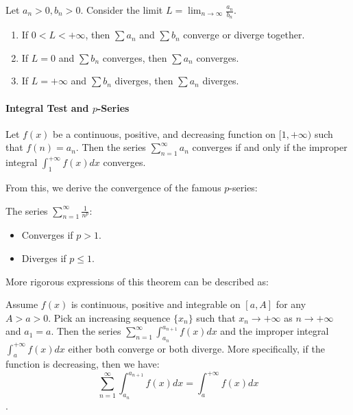 \begin{theorem}
Let $a_n > 0, b_n > 0$. Consider the limit $L = \lim_{n \to \infty} \frac{a_n}{b_n}$.
\begin{enumerate}
    \item If $0 < L < +\infty$, then $\sum a_n$ and $\sum b_n$ converge or diverge together.
    \item If $L = 0$ and $\sum b_n$ converges, then $\sum a_n$ converges.
    \item If $L = +\infty$ and $\sum b_n$ diverges, then $\sum a_n$ diverges.
\end{enumerate}
\end{theorem}

\paragraph{Integral Test and $p$-Series}
\begin{theorem}
Let $f(x)$ be a continuous, positive, and decreasing function on $[1, +\infty)$ such that $f(n) = a_n$. Then the series $\sum_{n=1}^{\infty} a_n$ converges if and only if the improper integral $\int_1^{+\infty} f(x) dx$ converges.
\end{theorem}

From this, we derive the convergence of the famous $p$-series:
\begin{corollary}[$p$-Series]
The series $\sum_{n=1}^{\infty} \frac{1}{n^p}$:
\begin{itemize}
    \item Converges if $p > 1$.
    \item Diverges if $p \le 1$.
\end{itemize}
\end{corollary}

More rigorous expressions of this theorem can be described as:

\begin{theorem}
    Assume $f(x)$ is continuous, positive and integrable on $[a,A]$ for any $A>a>0$. Pick an increasing sequence $\{x_n\}$ such that $x_n \to +\infty$ as $n \to +\infty$ and $a_1 = a$. Then the series $\sum_{n=1}^{\infty} \int_{a_n}^{a_{n+1}} f(x) dx$ and the improper integral $\int_a^{+\infty} f(x) dx$ either both converge or both diverge. 
    More specifically, if the function is decreasing, then we have:
    \[\sum_{n=1}^{\infty} \int_{a_n}^{a_{n+1}} f(x) dx = \int_a^{+\infty} f(x) dx\].
\end{theorem}

